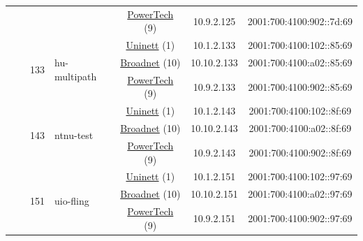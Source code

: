 \begin{small}
\begin{center}
\begin{longtable}{|c|c|c|c|c|c|c|c|}
  &  &  &  & \multicolumn{2}{|c|}{\tiny{\href{http://www.powertech.no}{PowerTech} (9)}} & \tiny{10.9.2.125} & \tiny{2001:700:4100:902::7d:69} \\* \cline{3-3}\cline{4-4}\cline{5-5}\cline{6-6}\cline{7-7}\cline{8-8}
  &  & \multirow{3}{*}{\tiny{133}} & \multicolumn{1}{|l|}{\multirow{3}{*}{\tiny{hu-multipath}}} & \multicolumn{2}{|c|}{\tiny{\href{https://www.uninett.no}{Uninett} (1)}} & \tiny{10.1.2.133} & \tiny{2001:700:4100:102::85:69} \\* \cline{5-5}\cline{6-6}\cline{7-7}\cline{8-8}
  &  &  &  & \multicolumn{2}{|c|}{\tiny{\href{https://www.broadnet.no}{Broadnet} (10)}} & \tiny{10.10.2.133} & \tiny{2001:700:4100:a02::85:69} \\* \cline{5-5}\cline{6-6}\cline{7-7}\cline{8-8}
  &  &  &  & \multicolumn{2}{|c|}{\tiny{\href{http://www.powertech.no}{PowerTech} (9)}} & \tiny{10.9.2.133} & \tiny{2001:700:4100:902::85:69} \\* \cline{3-3}\cline{4-4}\cline{5-5}\cline{6-6}\cline{7-7}\cline{8-8}
  &  & \multirow{3}{*}{\tiny{143}} & \multicolumn{1}{|l|}{\multirow{3}{*}{\tiny{ntnu-test}}} & \multicolumn{2}{|c|}{\tiny{\href{https://www.uninett.no}{Uninett} (1)}} & \tiny{10.1.2.143} & \tiny{2001:700:4100:102::8f:69} \\* \cline{5-5}\cline{6-6}\cline{7-7}\cline{8-8}
  &  &  &  & \multicolumn{2}{|c|}{\tiny{\href{https://www.broadnet.no}{Broadnet} (10)}} & \tiny{10.10.2.143} & \tiny{2001:700:4100:a02::8f:69} \\* \cline{5-5}\cline{6-6}\cline{7-7}\cline{8-8}
  &  &  &  & \multicolumn{2}{|c|}{\tiny{\href{http://www.powertech.no}{PowerTech} (9)}} & \tiny{10.9.2.143} & \tiny{2001:700:4100:902::8f:69} \\* \cline{3-3}\cline{4-4}\cline{5-5}\cline{6-6}\cline{7-7}\cline{8-8}
  &  & \multirow{3}{*}{\tiny{151}} & \multicolumn{1}{|l|}{\multirow{3}{*}{\tiny{uio-fling}}} & \multicolumn{2}{|c|}{\tiny{\href{https://www.uninett.no}{Uninett} (1)}} & \tiny{10.1.2.151} & \tiny{2001:700:4100:102::97:69} \\* \cline{5-5}\cline{6-6}\cline{7-7}\cline{8-8}
  &  &  &  & \multicolumn{2}{|c|}{\tiny{\href{https://www.broadnet.no}{Broadnet} (10)}} & \tiny{10.10.2.151} & \tiny{2001:700:4100:a02::97:69} \\* \cline{5-5}\cline{6-6}\cline{7-7}\cline{8-8}
  &  &  &  & \multicolumn{2}{|c|}{\tiny{\href{http://www.powertech.no}{PowerTech} (9)}} & \tiny{10.9.2.151} & \tiny{2001:700:4100:902::97:69} \\* \cline{3-3}\cline{4-4}\cline{5-5}\cline{6-6}\cline{7-7}\cline{8-8}

\end{longtable}
\end{center}
\end{small}

